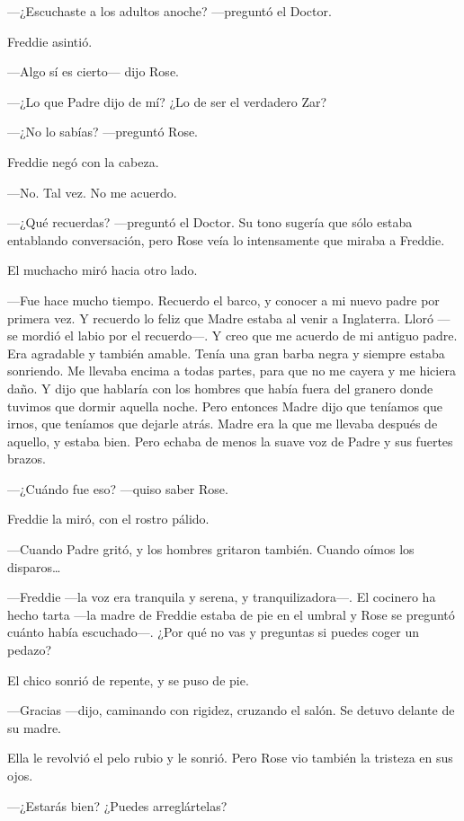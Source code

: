 {---¿Escuchaste a los adultos anoche? ---preguntó el Doctor.}

{Freddie asintió.}

{---Algo sí es cierto--- dijo Rose.}

{---¿Lo que Padre dijo de mí? ¿Lo de ser el verdadero Zar?}

{---¿No lo sabías? ---preguntó Rose.}

{Freddie negó con la cabeza.}

{---No. Tal vez. No me acuerdo.}

{---¿Qué recuerdas? ---preguntó el Doctor. Su tono sugería que sólo
	estaba entablando conversación, pero Rose veía lo intensamente que
miraba a Freddie.}

{El muchacho miró hacia otro lado.}

{---Fue hace mucho tiempo. Recuerdo el barco, y conocer a mi nuevo padre
	por primera vez. Y recuerdo lo feliz que Madre estaba al venir a
	Inglaterra. Lloró ---se mordió el labio por el recuerdo---. Y creo que
	me acuerdo de mi antiguo padre. Era agradable y también amable. Tenía
	una gran barba negra y siempre estaba sonriendo. Me llevaba encima a
	todas partes, para que no me cayera y me hiciera daño. Y dijo que
	hablaría con los hombres que había fuera del granero donde tuvimos que
	dormir aquella noche. Pero entonces Madre dijo que teníamos que irnos,
	que teníamos que dejarle atrás. Madre era la que me llevaba después de
	aquello, y estaba bien. Pero echaba de menos la suave voz de Padre y sus
fuertes brazos.}

{---¿Cuándo fue eso? ---quiso saber Rose.}

{Freddie la miró, con el rostro pálido.}

{---Cuando Padre gritó, y los hombres gritaron también. Cuando oímos los
	disparos\ldots{}}

{---Freddie ---la voz era tranquila y serena, y tranquilizadora---. El
	cocinero ha hecho tarta ---la madre de Freddie estaba de pie en el
	umbral y Rose se preguntó cuánto había escuchado---. ¿Por qué no vas y
preguntas si puedes coger un pedazo?}

{El chico sonrió de repente, y se puso de pie.}

{---Gracias ---dijo, caminando con rigidez, cruzando el salón. Se detuvo
delante de su madre.}

{Ella le revolvió el pelo rubio y le sonrió. Pero Rose vio también la
tristeza en sus ojos.}

{---¿Estarás bien? ¿Puedes arreglártelas?}

